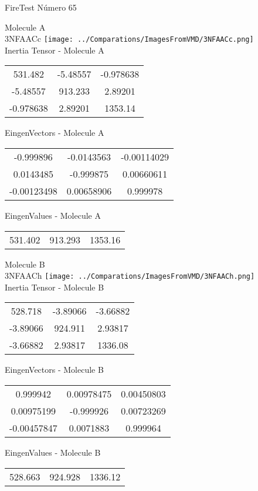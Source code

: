 \vtab[-2cm]
\begin{center}
{\large FireTest \tab Número 65}
\end{center}
\begin{multicols}{2}
\begin{center}

Molecule A \\ 
3NFAACc
\texttt{[image: ../Comparations/ImagesFromVMD/3NFAACc.png]}
\\
Inertia Tensor - Molecule A \\
\vtab

\begin{tabular}{|c c c|}
531.482	 & 	-5.48557	 & 	-0.978638	 \\
-5.48557	 & 	913.233	 & 	2.89201	 \\
-0.978638	 & 	2.89201	 & 	1353.14
\end{tabular}

\vtab
 EingenVectors - Molecule A     \\
\vtab
\begin{tabular}{|c c c|}
-0.999896	 & 	-0.0143563	 & 	-0.00114029	 \\
0.0143485	 & 	-0.999875	 & 	0.00660611	 \\
-0.00123498	 & 	0.00658906	 & 	0.999978
\end{tabular}

\vtab
 EingenValues - Molecule A     \\
\vtab
\begin{tabular}{|c c c|}
531.402	 & 	913.293	 & 	1353.16	 \\
\end{tabular}
\columnbreak

Molecule B \\ 
3NFAACh
\texttt{[image: ../Comparations/ImagesFromVMD/3NFAACh.png]}
\\
Inertia Tensor - Molecule B \\
\vtab

\begin{tabular}{|c c c|}
528.718	 & 	-3.89066	 & 	-3.66882	 \\
-3.89066	 & 	924.911	 & 	2.93817	 \\
-3.66882	 & 	2.93817	 & 	1336.08
\end{tabular}

\vtab
 EingenVectors - Molecule B     \\
\vtab
\begin{tabular}{|c c c|}
0.999942	 & 	0.00978475	 & 	0.00450803	 \\
0.00975199	 & 	-0.999926	 & 	0.00723269	 \\
-0.00457847	 & 	0.0071883	 & 	0.999964
\end{tabular}

\vtab
 EingenValues - Molecule B     \\
\vtab
\begin{tabular}{|c c c|}
528.663	 & 	924.928	 & 	1336.12	 \\
\end{tabular}

\end{center}
\end{multicols}
